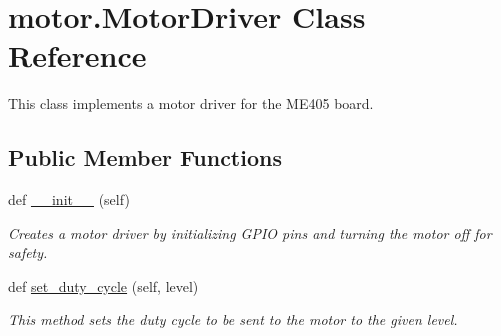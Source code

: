 \hypertarget{classmotor_1_1MotorDriver}{}\section{motor.\+Motor\+Driver Class Reference}
\label{classmotor_1_1MotorDriver}


This class implements a motor driver for the M\+E405 board.  


\subsection*{Public Member Functions}
\begin{DoxyCompactItemize}
\item 
def \hyperlink{classmotor_1_1MotorDriver_a9e10ee95953b802b06ad4b9b3b6e35b9}{\+\_\+\+\_\+init\+\_\+\+\_\+} (self)
\begin{DoxyCompactList}\small\item\em Creates a motor driver by initializing G\+P\+IO pins and turning the motor off for safety. \end{DoxyCompactList}\item 
def \hyperlink{classmotor_1_1MotorDriver_a51b4721406aa66e0807413199b8b700f}{set\+\_\+duty\+\_\+cycle} (self, level)
\begin{DoxyCompactList}\small\item\em This method sets the duty cycle to be sent to the motor to the given level. \end{DoxyCompactList}\end{DoxyCompactItemize}
